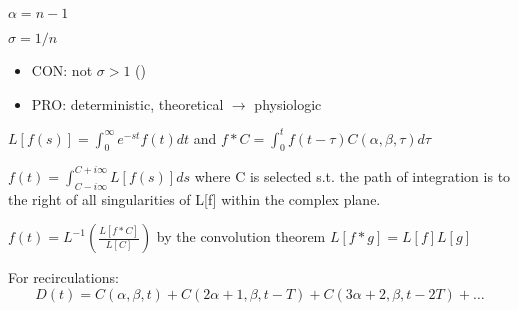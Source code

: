 \begin{frame}
\begin{columns}
\begin{column}{0.5\textwidth}
{\begin{block}{\textwidth}
        $\alpha = n - 1$
    
        $\sigma = 1 / n$
        \begin{itemize}
            \item CON: not $\sigma > 1$ (\cite{thompsonIndicatorTransitTime1964})
        \end{itemize}
    \end{block}

    \begin{itemize}
        \item PRO: deterministic, theoretical $\rightarrow$ physiologic
    \end{itemize}
    
    $L[f(s)] = \int_0^\infty e^{-st} f(t) dt$
    and
    $f*C = \int_0^t f(t-\tau) C(\alpha, \beta, \tau) d\tau$
    
    $f(t) = \int_{C-i\infty}^{C+i\infty} L[f(s)] ds$
    where C is selected s.t. the path of integration is to the right of all singularities of L[f] within the complex plane.

    $f(t) = L^{-1}\left(\frac{L[f*C]}{L[C]}\right)$
    by the convolution theorem
    $L[f*g] = L[f]L[g]$
    
    For recirculations:
    \begin{equation}
    D(t) = C(\alpha, \beta, t) + C(2\alpha+1, \beta, t-T) + C(3\alpha+2, \beta, t-2T) + \dots
    \end{equation}
    }
    \end{column}
    \end{columns}
\end{frame}


